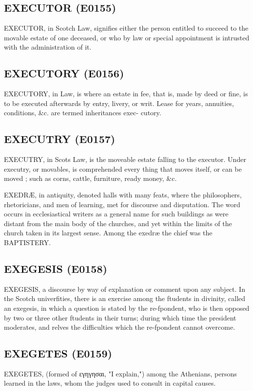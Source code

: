 \documentclass{article}
\begin{document}
\subsection*{EXECUTOR (E0155)}
EXECUTOR, in Scotch Law, signifies either the person entitled to succeed to the movable estate of one deceased, or who by law or special appointment is intrusted with the administration of it.

\subsection*{EXECUTORY (E0156)}
EXECUTORY, in Law, is where an estate in fee, that is, made by deed or fine, is to be executed afterwards by entry, livery, or writ. Lease for years, annuities, conditions, \&c. are termed inheritances exec- cutory.

\subsection*{EXECUTRY (E0157)}
EXECUTRY, in Scots Law, is the moveable estate falling to the executor. Under executry, or movables, is comprehended every thing that moves itself, or can be moved ; such as corns, cattle, furniture, ready money, \&c.

EXEDRÆ, in antiquity, denoted halls with many feats, where the philosophers, rhetoricians, and men of learning, met for discourse and disputation. The word occurs in ecclesiastical writers as a general name for such buildings as were distant from the main body of the churches, and yet within the limits of the church taken in its largest sense. Among the exedræ the chief was the BAPTISTERY.

\subsection*{EXEGESIS (E0158)}
EXEGESIS, a discourse by way of explanation or comment upon any subject. In the Scotch univerfities, there is an exercise among the ftudents in divinity, called an exegesis, in which a question is stated by the re-fpondent, who is then opposed by two or three other ftudents in their turns; during which time the president moderates, and relves the difficulties which the re-fpondent cannot overcome.

\subsection*{EXEGETES (E0159)}
EXEGETES, (formed of εγηγησαι, "I explain,") among the Athenians, persons learned in the laws, whom the judges used to consult in capital causes.
\end{document}
